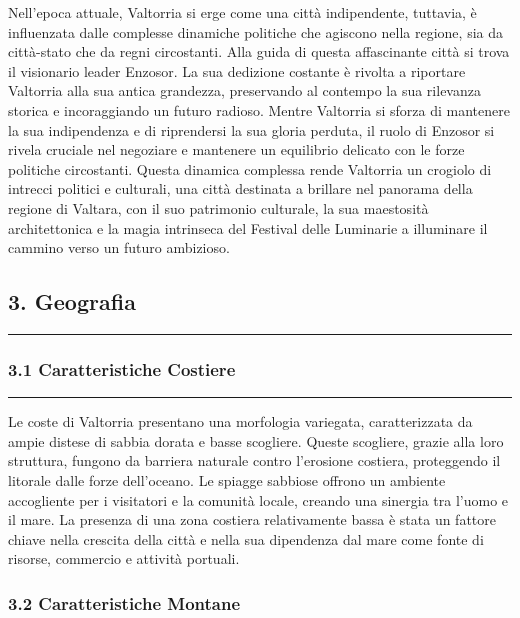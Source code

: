 Nell'epoca attuale, Valtorria si erge come una città indipendente,
tuttavia, è influenzata dalle complesse dinamiche politiche che agiscono
nella regione, sia da città-stato che da regni circostanti. Alla guida
di questa affascinante città si trova il visionario leader Enzosor. La
sua dedizione costante è rivolta a riportare Valtorria alla sua antica
grandezza, preservando al contempo la sua rilevanza storica e
incoraggiando un futuro radioso. Mentre Valtorria si sforza di mantenere
la sua indipendenza e di riprendersi la sua gloria perduta, il ruolo di
Enzosor si rivela cruciale nel negoziare e mantenere un equilibrio
delicato con le forze politiche circostanti. Questa dinamica complessa
rende Valtorria un crogiolo di intrecci politici e culturali, una città
destinata a brillare nel panorama della regione di Valtara, con il suo
patrimonio culturale, la sua maestosità architettonica e la magia
intrinseca del Festival delle Luminarie a illuminare il cammino verso un
futuro ambizioso.

\subsection{3. Geografia}\label{geografia}

\begin{center}\rule{0.5\linewidth}{0.5pt}\end{center}

\subsubsection{3.1 Caratteristiche
Costiere}\label{caratteristiche-costiere}

\begin{center}\rule{0.5\linewidth}{0.5pt}\end{center}

Le coste di Valtorria presentano una morfologia variegata,
caratterizzata da ampie distese di sabbia dorata e basse scogliere.
Queste scogliere, grazie alla loro struttura, fungono da barriera
naturale contro l'erosione costiera, proteggendo il litorale dalle forze
dell'oceano. Le spiagge sabbiose offrono un ambiente accogliente per i
visitatori e la comunità locale, creando una sinergia tra l'uomo e il
mare. La presenza di una zona costiera relativamente bassa è stata un
fattore chiave nella crescita della città e nella sua dipendenza dal
mare come fonte di risorse, commercio e attività portuali.

\subsubsection{3.2 Caratteristiche
Montane}\label{caratteristiche-montane}

